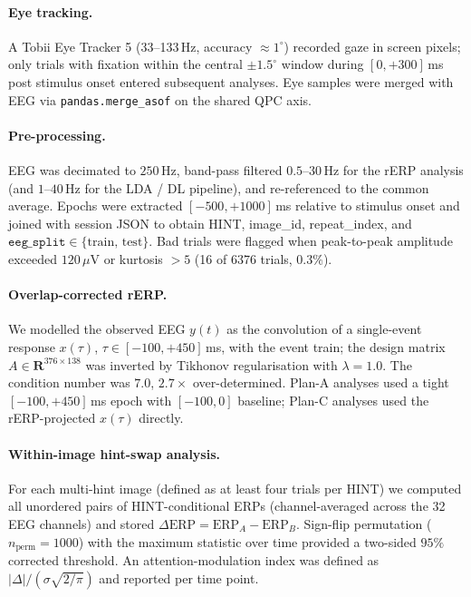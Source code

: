 \documentclass[12pt]{article}
\begin{document}
\paragraph*{Eye tracking.}
A Tobii Eye Tracker 5 (33--133\,Hz, accuracy $\approx 1^\circ$)
recorded gaze in screen pixels; only trials with fixation within
the central $\pm 1.5^\circ$ window during $[0,+300]$\,ms post
stimulus onset entered subsequent analyses.  Eye samples were
merged with EEG via \texttt{pandas.merge\_asof} on the shared QPC
axis.

\paragraph*{Pre-processing.}
EEG was decimated to $250$\,Hz, band-pass filtered $0.5$--$30$\,Hz
for the rERP analysis (and $1$--$40$\,Hz for the LDA / DL pipeline),
and re-referenced to the common average.  Epochs were extracted
$[-500,+1000]$\,ms relative to stimulus onset and joined with
session JSON to obtain HINT, image\_id, repeat\_index, and
$\texttt{eeg\_split}\in\{\mbox{train, test}\}$.  Bad trials were
flagged when peak-to-peak amplitude exceeded $120$\,$\mu$V or
kurtosis $> 5$ (16 of 6376 trials, $0.3\%$).

\paragraph*{Overlap-corrected rERP.}
We modelled the observed EEG $y(t)$ as the convolution of a
single-event response $x(\tau)$, $\tau\in[-100,+450]$\,ms, with the
event train; the design matrix $A\in\mathbf{R}^{376\times138}$ was
inverted by Tikhonov regularisation with $\lambda=1.0$.  The
condition number was $7.0$, $2.7\times$ over-determined.  Plan-A
analyses used a tight $[-100,+450]$\,ms epoch with $[-100,0]$
baseline; Plan-C analyses used the rERP-projected
$x(\tau)$ directly.

\paragraph*{Within-image hint-swap analysis.}
For each multi-hint image (defined as at least four trials per
HINT) we computed all unordered pairs of HINT-conditional ERPs
(channel-averaged across the 32 EEG channels) and stored
$\Delta\mbox{ERP} = \mbox{ERP}_A - \mbox{ERP}_B$.  Sign-flip
permutation ($n_{\mbox{perm}}=1000$) with the maximum statistic over
time provided a two-sided $95\%$ corrected threshold.  An
attention-modulation index was defined as
$|\Delta|/(\sigma\sqrt{2/\pi})$ and reported per time point.
\end{document}
